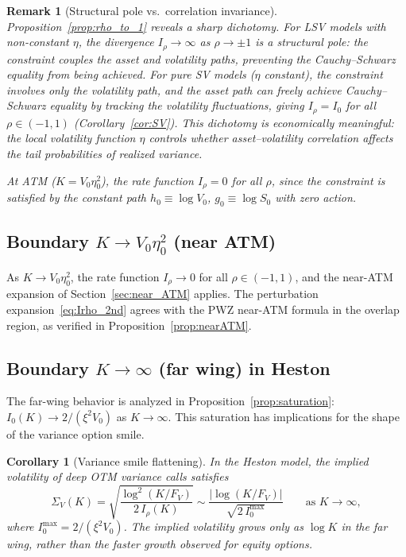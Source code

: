 \documentclass[11pt]{article}
\newtheorem{corollary}[theorem]{Corollary}
\newtheorem{remark}[theorem]{Remark}
\theoremstyle{definition}
\begin{document}
\begin{remark}[Structural pole vs.\ correlation invariance]\label{rem:structural_pole}
Proposition~\ref{prop:rho_to_1} reveals a sharp dichotomy. For LSV models with non-constant $\eta$, the divergence $I_\rho \to \infty$ as $\rho \to \pm 1$ is a \emph{structural pole}: the constraint couples the asset and volatility paths, preventing the Cauchy--Schwarz equality from being achieved. For pure SV models ($\eta$ constant), the constraint involves only the volatility path, and the asset path can freely achieve Cauchy--Schwarz equality by tracking the volatility fluctuations, giving $I_\rho = I_0$ for all $\rho \in (-1,1)$ (Corollary~\ref{cor:SV}). This dichotomy is economically meaningful: the local volatility function $\eta$ controls whether asset--volatility correlation affects the tail probabilities of realized variance.

At ATM ($K = V_0\eta_0^2$), the rate function $I_\rho = 0$ for all $\rho$, since the constraint is satisfied by the constant path $h_0 \equiv \log V_0$, $g_0 \equiv \log S_0$ with zero action.
\end{remark}

\subsection{Boundary $K \to V_0\eta_0^2$ (near ATM)}\label{sec:K_to_ATM}

As $K \to V_0\eta_0^2$, the rate function $I_\rho \to 0$ for all $\rho \in (-1,1)$, and the near-ATM expansion of Section~\ref{sec:near_ATM} applies. The perturbation expansion~\eqref{eq:Irho_2nd} agrees with the PWZ near-ATM formula in the overlap region, as verified in Proposition~\ref{prop:nearATM}.

\subsection{Boundary $K \to \infty$ (far wing) in Heston}\label{sec:K_to_infty}

The far-wing behavior is analyzed in Proposition~\ref{prop:saturation}: $I_0(K) \to 2/(\xi^2 V_0)$ as $K \to \infty$. This saturation has implications for the shape of the variance option smile.

\begin{corollary}[Variance smile flattening]\label{cor:smile_flattening}
In the Heston model, the implied volatility of deep OTM variance calls satisfies
\begin{equation}
  \Sigma_V(K) = \sqrt{\frac{\log^2(K/F_V)}{2\,I_\rho(K)}} \sim \frac{|\log(K/F_V)|}{\sqrt{2\,I_0^{\max}}} \qquad \text{as } K \to \infty,
\end{equation}
where $I_0^{\max} = 2/(\xi^2 V_0)$. The implied volatility grows only as $\log K$ in the far wing, rather than the faster growth observed for equity options.
\end{corollary}
\end{document}
